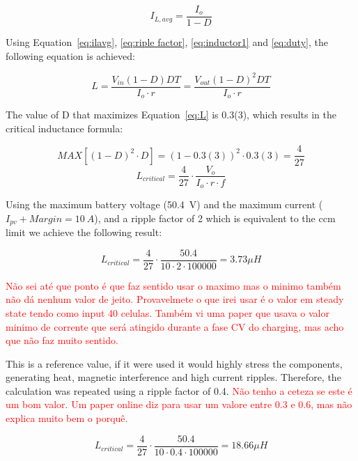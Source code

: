 \begin{equation}
    I_{L,avg} = \frac{I_o}{1-D}
    \label{eq:ilavg}
\end{equation}

Using Equation~\ref{eq:ilavg}, \ref{eq:riple factor}, \ref{eq:inductor1} and \ref{eq:duty}, the following equation is achieved:

\begin{equation}
    L = \frac{V_{in} (1-D)DT}{I_o \cdot r} = \frac{V_{out}(1-D)^2DT}{I_o \cdot r}
    \label{eq:L}
\end{equation}

The value of D that maximizes Equation~\ref{eq:L} is 0.3(3), which results in the critical inductance formula:

\begin{equation}
    MAX[(1-D)^2\cdot D]= (1-0.3(3))^2 \cdot 0.3(3)= \frac{4}{27}
\end{equation}
\begin{equation}
    L_{critical} = \frac{4}{27} \cdot \frac{V_o}{I_o \cdot r \cdot f}
\end{equation}

Using the maximum battery voltage (50.4~V) and the maximum current ($I_{pv}+Margin=10~A$), and a ripple factor of 2 which is equivalent  to the \ac{ccm} limit we achieve the following result:

\begin{equation}
    L_{critical} = \frac{4}{27} \cdot \frac{50.4}{10 \cdot 2 \cdot 100000} = 3.73 \mu H
\end{equation}

\textcolor{red}{Não sei até que ponto é que faz sentido usar o maximo mas o minimo também não dá nenhum valor de jeito. Provavelmete o que irei usar é o valor em steady state tendo como input 40 celulas. Também vi uma paper que usava o valor minimo de corrente que será atingido durante a fase CV do charging, mas acho que não faz muito sentido.}

This is a reference value, if it were used it would highly stress the components, generating heat, magnetic interference and high current ripples. Therefore, the calculation was repeated using a ripple factor of 0.4. \textcolor{red}{Não tenho a ceteza se este é um bom valor. Um paper online diz para usar um valore entre 0.3 e 0.6, mas não explica muito bem o porquê.} 


\begin{equation}
    L_{critical} = \frac{4}{27} \cdot \frac{50.4}{10 \cdot 0.4 \cdot 100000} = 18.66 \mu H
\end{equation}

